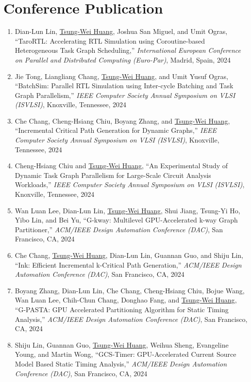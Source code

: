 \documentclass[A4,11pt]{article}
\begin{document}
\section{Conference Publication}
 \begin{enumerate}
 \itemsep-3pt
    \item Dian-Lun Lin, \underline{Tsung-Wei Huang}, Joshua San Miguel, and Umit Ogras, ``TaroRTL: Accelerating RTL Simulation using Coroutine-based Heterogeneous Task Graph Scheduling,'' \textit{International European Conference on Parallel and Distributed Computing (Euro-Par)}, Madrid, Spain, 2024
    \item Jie Tong, Liangliang Chang, \underline{Tsung-Wei Huang}, and Umit Yusuf Ogras, ``BatchSim: Parallel RTL Simulation using Inter-cycle Batching and Task Graph Parallelism,'' \textit{IEEE Computer Society Annual Symposium on VLSI (ISVLSI)}, Knoxville, Tennessee, 2024
    \item Che Chang, Cheng-Hsiang Chiu, Boyang Zhang, and \underline{Tsung-Wei Huang}, ``Incremental Critical Path Generation for Dynamic Graphs,'' \textit{IEEE Computer Society Annual Symposium on VLSI (ISVLSI)}, Knoxville, Tennessee, 2024
    \item Cheng-Hsiang Chiu and \underline{Tsung-Wei Huang}, ``An Experimental Study of Dynamic Task Graph Parallelism for Large-Scale Circuit Analysis Workloads,'' \textit{IEEE Computer Society Annual Symposium on VLSI (ISVLSI)}, Knoxville, Tennessee, 2024
    \item Wan Luan Lee, Dian-Lun Lin, \underline{Tsung-Wei Huang}, Shui Jiang, Tsung-Yi Ho, Yibo Lin, and Bei Yu, ``G-kway: Multilevel GPU-Accelerated k-way Graph Partitioner,'' \textit{ACM/IEEE Design Automation Conference (DAC)}, San Francisco, CA, 2024
    \item Che Chang, \underline{Tsung-Wei Huang}, Dian-Lun Lin, Guannan Guo, and Shiju Lin, ``Ink: Efficient Incremental k-Critical Path Generation,'' \textit{ACM/IEEE Design Automation Conference (DAC)}, San Francisco, CA, 2024
    \item Boyang Zhang, Dian-Lun Lin, Che Chang, Cheng-Hsiang Chiu, Bojue Wang, Wan Luan Lee, Chih-Chun Chang, Donghao Fang, and \underline{Tsung-Wei Huang}, ``G-PASTA: GPU Accelerated Partitioning Algorithm for Static Timing Analysis,'' \textit{ACM/IEEE Design Automation Conference (DAC)}, San Francisco, CA, 2024
    \item Shiju Lin, Guannan Guo, \underline{Tsung-Wei Huang}, Weihua Sheng, Evangeline Young, and Martin Wong, ``GCS-Timer: GPU-Accelerated Current Source Model Based Static Timing Analysis,'' \textit{ACM/IEEE Design Automation Conference (DAC)}, San Francisco, CA, 2024

\end{enumerate}
\end{document}
